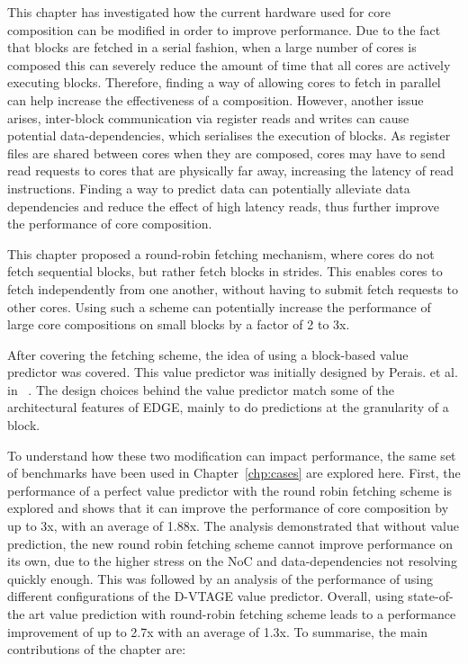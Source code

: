 This chapter has investigated how the current hardware used for core composition can be modified in order to improve performance.
Due to the fact that blocks are fetched in a serial fashion, when a large number of cores is composed this can severely reduce the amount of time that all cores are actively executing blocks.
Therefore, finding a way of allowing cores to fetch in parallel can help increase the effectiveness of a composition.
However, another issue arises, inter-block communication via register reads and writes can cause potential data-dependencies, which serialises the execution of blocks.
As register files are shared between cores when they are composed, cores may have to send read requests to cores that are physically far away, increasing the latency of read instructions.
Finding a way to predict data can potentially alleviate data dependencies and reduce the effect of high latency reads, thus further improve the performance of core composition.

This chapter proposed a round-robin fetching mechanism, where cores do not fetch sequential blocks, but rather fetch blocks in strides.
This enables cores to fetch independently from one another, without having to submit fetch requests to other cores.
Using such a scheme can potentially increase the performance of large core compositions on small blocks by a factor of 2 to 3x.

After covering the fetching scheme, the idea of using a block-based value predictor was covered.
This value predictor was initially designed by Perais. et al. in ~\cite{peraisVTAGE2014, peraisBeBop2015}.
The design choices behind the value predictor match some of the architectural features of EDGE, mainly to do predictions at the granularity of a block.

To understand how these two modification can impact performance, the same set of benchmarks have been used in Chapter~\ref{chp:cases} are explored here.
First, the performance of a perfect value predictor with the round robin fetching scheme is explored and shows that it can improve the performance of core composition by up to 3x, with an average of 1.88x.
The analysis demonstrated that without value prediction, the new round robin fetching scheme cannot improve performance on its own, due to the higher stress on the NoC and data-dependencies not resolving quickly enough.
This was followed by an analysis of the performance of using different configurations of the D-VTAGE value predictor.
Overall, using state-of-the art value prediction with round-robin fetching scheme leads to a performance improvement of up to 2.7x with an average of 1.3x.
To summarise, the main contributions of the chapter are:

